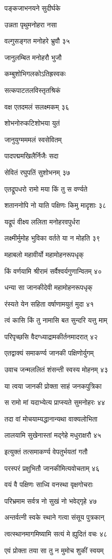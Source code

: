 पङ्कजाभनयने सुदीर्घके

उन्नता पृथुमनोहरा नसा

वल्गुसङ्गत मनोहरे भ्रुवौ ३५

जानुलम्बित मनोहरौ भुजौ

कम्बुशोभिगलकोऽतिह्रस्वकः

सत्कपाटतलविस्तृतश्रिकं

वक्ष एतदमलं सलक्ष्मकम् ३६

शोभनोरुकटिशोभया युतं

जानुयुग्मममलं स्वसेवितम्

पादपद्ममखिलैर्निजैः सदा

सेवितं रघुपतिं सुशोभनम् ३७

एतद्रूपधरो रामो मया किं तु स वर्ण्यते

शताननोपि नो याति पक्षिणः किमु मादृशाः ३८

यद्रूपं वीक्ष्य ललिता मनोहरवपुर्धरा

लक्ष्मीर्मुमोह भुविका वर्तते या न मोहति ३९

महाबलो महावीर्यो महामोहनरूपधृक्

किं वर्णयामि श्रीरामं सर्वैश्वर्यगुणान्वितम् ४०

धन्या सा जानकीदेवी महामोहनरूपधृक्

रंस्यते येन सहिता वर्षाणामयुतं मुदा ४१

त्वं कासि किं तु नामासि बत सुन्दरि यत्तु माम्

परिपृच्छसि वैदग्ध्याद्रामकीर्तनमादरात् ४२

एतद्वाक्यं समाकर्ण्य जानकी पक्षिणोर्युगम्

उवाच जन्मललितं शंसन्ती स्वस्य मोहनम् ४३

या त्वया जानकी प्रोक्ता साहं जनकपुत्रिका

स रामो मां यदाभ्येत्य प्राप्स्यते सुमनोहरः ४४

तदा वां मोचयाम्यद्धानान्यथा वाक्यलोभिता

लालयामि सुखेनास्तां मद्गेहे मधुराक्षरौ ४५

इत्युक्तं तत्समाकर्ण्य वेपतुर्भयतां गतौ

परस्परं प्रक्षुभितौ जानकीमित्यवोचताम् ४६

वयं वै पक्षिणः साध्वि वनस्था वृक्षगोचराः

परिभ्रमाम सर्वत्र नो सुखं नो भवेद्गृहे ४७

अन्तर्वत्नी स्वके स्थाने गत्वा संसूय पुत्रकान्

त्वत्स्थानमागमिष्यामि सत्यं मे ह्युदितं वचः ४८

एवं प्रोक्ता तया सा तु न मुमोच शुकीं स्वयम्

